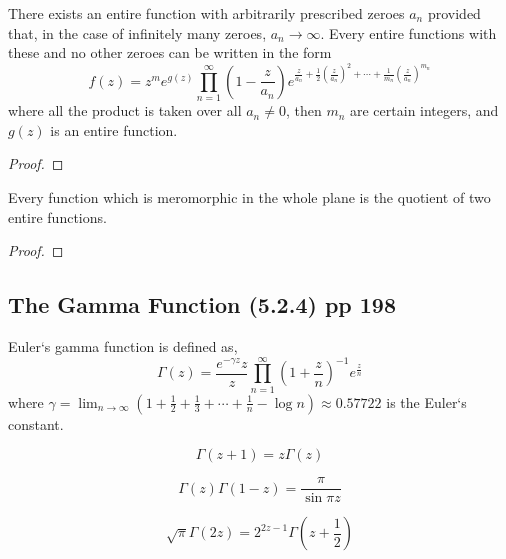 \begin{theorem}[Weierstrass]
	There exists an entire function with arbitrarily prescribed zeroes $a_n$ provided that, in the case of infinitely many zeroes, $a_n \to \infty$. Every entire functions with these and no other zeroes can be written in the form
	\begin{equation}
		f(z) = z^m e^{g(z)} \prod_{n=1}^\infty \left( 1- \frac{z}{a_n} \right) e^{\frac{z}{a_n} + \frac{1}{2}(\frac{z}{a_n})^2 + \dotsb + \frac{1}{m_n}(\frac{z}{a_n})^{m_n}}
	\end{equation}
	where all the product is taken over all $a_n \ne 0$, then $m_n$ are certain integers, and $g(z)$ is an entire function.
\end{theorem}
\begin{proof}
\end{proof}

\begin{corollary}
	Every function which is meromorphic in the whole plane is the quotient of two entire functions.
\end{corollary}
\begin{proof}
\end{proof}

\subsection{The Gamma Function (5.2.4) pp 198}
\begin{definition}
	Euler`s gamma function is defined as,
\begin{equation}
	\Gamma(z) = \frac{e^{-\gamma z}{z}}{z} \prod_{n=1}^\infty \left( 1+\frac{z}{n}\right)^{-1} e^\frac{z}{n}
\end{equation}
	where $\gamma = \displaystyle \lim_{n \to \infty} \left( 1+ \frac{1}{2} + \frac{1}{3} + \dotsb + \frac{1}{n} - \log n \right) \approx 0.57722 $ is the Euler`s constant.
\end{definition}
\begin{remark}
	\begin{equation}
		\Gamma(z+1) = z \Gamma(z)
	\end{equation}
\end{remark}
\begin{remark}
	\begin{equation}
		\Gamma(z) \Gamma(1-z) = \frac{\pi}{\sin \pi z}
	\end{equation}
\end{remark}
\begin{remark}
	\begin{equation}
		\sqrt{\pi} \Gamma(2z) = 2^{2z-1} \Gamma\left(z+\frac{1}{2}\right)
	\end{equation}
\end{remark}
